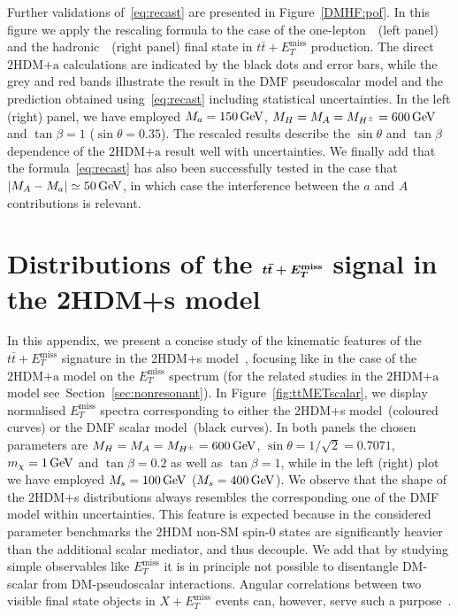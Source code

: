 \documentclass[a4paper, 11pt,notoc]{article}
\newcommand{\MET}{\ensuremath{E_T^\mathrm{miss}}\xspace}
\newcommand{\mA}{\ensuremath{M_{A}}\xspace}
\newcommand{\ma}{\ensuremath{M_{a}}\xspace}
\newcommand{\mH}{\ensuremath{M_{H}}\xspace}
\newcommand{\mHc}{\ensuremath{M_{H^{\pm}}}\xspace}
\newcommand{\hdma}{\ensuremath{\textrm{2HDM+a}}\xspace}
\def\bm#1{\mbox{\boldmath$#1$\unboldmath}}
\begin{document}
Further validations of~\eqref{eq:recast} are presented in Figure~\ref{DMHF:pof}. In this figure we apply the rescaling formula to the case of the  one-lepton~\cite{Aaboud:2017aeu}~(left panel)   and the hadronic~\cite{Aaboud:2017rzf}~(right panel)  final state in $t \bar t+\MET$ production. The direct \hdma calculations are indicated by the black dots and error bars, while the grey and red  bands illustrate the result in the DMF pseudoscalar model and the prediction obtained using~\eqref{eq:recast} including statistical uncertainties.  In the left (right) panel, we have employed $\ma = 150 \, {\rm GeV}$, $\mH= \mA = \mHc = 600 \, {\rm GeV}$ and $\tan \beta = 1$ ($\sin\theta=0.35$). The rescaled results describe the $\sin \theta$ and $\tan \beta$ dependence of the \hdma result well with uncertainties.  We finally add that the formula~\eqref{eq:recast} has also been successfully tested in the case that $|\mA - \ma| \simeq 50 \, {\rm GeV}$, in which case the interference between the $a$ and $A$ contributions is relevant.  


\section{Distributions of the $\bm{t \bar t + \MET}$ signal in the 2HDM+s model}
\label{app:ttMETscalar}

In this appendix, we present a concise study of the kinematic features of the  $t \bar t + \MET$ signature in the 2HDM+s model~\cite{Bell:2016ekl,Bell:2017rgi}, focusing like in the case of the  \hdma model on the $\MET$ spectrum (for the related studies in the \hdma model see~Section~\ref{sec:nonresonant}).  In Figure~\ref{fig:ttMETscalar}, we display normalised $\MET$ spectra corresponding to either  the 2HDM+s model~(coloured curves) or the DMF scalar   model~(black curves). In both panels the chosen parameters are $M_H = M_A = M_{H^\pm} = 600 \, {\rm GeV}$, $\sin\theta=1/\sqrt{2}=0.7071$, $m_\chi = 1 \, {\rm GeV}$ and $\tan \beta = 0.2$ as well as $\tan \beta = 1$, while in the left (right) plot we have employed $M_s = 100 \, {\rm GeV}$ ($M_s = 400 \, {\rm GeV}$). We observe that  the shape of the 2HDM+s distributions always  resembles  the corresponding one of the DMF model within uncertainties. This feature is expected because in the considered parameter benchmarks the 2HDM non-SM spin-0 states are significantly heavier than the additional scalar mediator, and thus decouple. We add that by studying simple observables like $\MET$ it is in principle not possible to disentangle DM-scalar from DM-pseudoscalar interactions. Angular correlations between  two visible final state objects in $X+\MET$ events can, however, serve such a purpose~\cite{Haisch:2016gry,Cotta:2012nj,Haisch:2013fla,Crivellin:2015wva}. 
\end{document}
